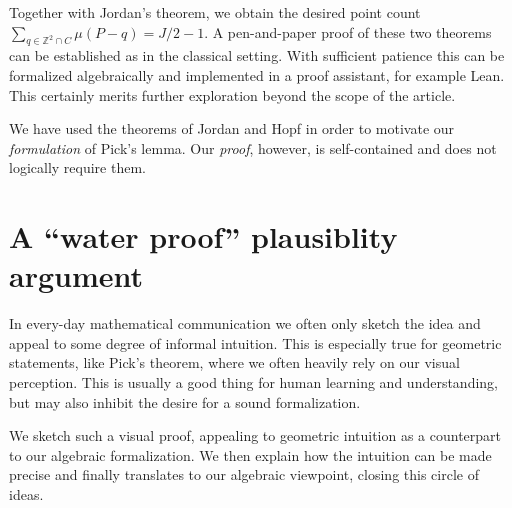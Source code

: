 \documentclass[a4paper]{amsart}
\numberwithin{equation}{section}
\theoremstyle{plain}
\theoremstyle{definition}
\newcommand{\Z}{\mathbb{Z}}
\begin{document}
Together with Jordan's theorem, we obtain the desired
point count $\sum_{q \in \Z^2 \cap C} \mu(P-q) = J/2 - 1$.
%
A pen-and-paper proof of these two theorems
can be established as in the classical setting.
With sufficient patience this can be formalized algebraically
and implemented in a proof assistant, for example Lean.
This certainly merits further exploration beyond the scope of the article.

We have used the theorems of Jordan and Hopf in order
to motivate our \emph{formulation} of Pick's lemma.
Our \emph{proof}, however, is self-contained and
does not logically require them.


\setcounter{section}{22}
\section{A ``water proof'' plausiblity argument}

In every-day mathematical communication we often only sketch
the idea and appeal to some degree of informal intuition.
This is especially true for geometric statements,
like Pick's theorem, where we often heavily rely on our visual perception.
This is usually a good thing for human learning and understanding,
but may also inhibit the desire for a sound formalization.

We sketch such a visual proof, appealing to geometric intuition
as a counterpart to our algebraic formalization.
We then explain how the intuition can be made precise
and finally translates to our algebraic viewpoint,
closing this circle of ideas.
\end{document}
